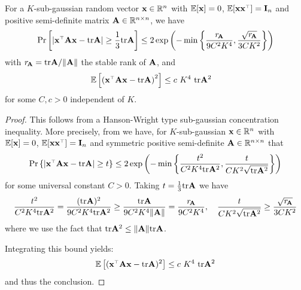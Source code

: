\documentclass[thesis.tex]{subfiles}
\begin{document}
%
%
%
\begin{lemma}
\label{l:concentration-sub-gaussian}
For a $K$-sub-gaussian random vector $\mathbf x \in \mathbb R^n$ with $\mathbb E[\mathbf x] = 0$, $\E[\x \x^\top] = \I_n$ and positive semi-definite matrix $\mathbf A \in \mathbb R^{n \times n}$, we have
\[
  \Pr\left[
    \lvert \x^\top \A \x - \tr \A \rvert
    \geq \frac13 \tr \A
    \right] \leq 2 \exp\left( - \min \left\{ \frac{r_{\!\A}}{9 C^2 K^4}, \frac{\sqrt{r_{\!\A}}}{3 C K^2}  \right\} \right)
\]
with $r_{\!\mathbf A} = \mathrm{tr} \mathbf A/\| \mathbf A \|$ the stable rank of $\mathbf A$, and 
\begin{align*}
  \E\left[ \left( \x^\top \A \x - \tr \A \right)^2 \right]
  &\leq c~K^4~\tr \A^2
\end{align*}
for some $C,c > 0$ independent of $K$.
\end{lemma}

\begin{proof}
This follows from a Hanson-Wright type \cite{rudelson2013hanson} sub-gaussian concentration inequality. More precisely,
from \cite[Corollary 2.9]{zajkowski2018bounds} we have, for $K$-sub-gaussian $\mathbf x \in \mathbb R^n$ with $\mathbb E[\mathbf x] = 0$, $\E[\x \x^\top] = \I_n$ and symmetric positive semi-definite $\mathbf A \in \mathbb R^{n \times n}$ that 
\[
  \Pr \left\{ \left| \x^\top \A \x - \tr \A  \right| \ge t \right\} \le 2 \exp \left( - \min \left\{ \frac{t^2}{C^2 K^4 \tr\A^2 },  \frac{t}{C K^2 \sqrt{\tr\A^2}  } \right\} \right)
\]
for some universal constant $C > 0$. Taking $t = \frac13 \mathrm{tr} \mathbf A$ we have
\[
  \frac{t^2}{C^2 K^4 \mathrm{tr}\mathbf A^2 } = \frac{ (\mathrm{tr} \mathbf A)^2 }{9 C^2 K^4 \mathrm{tr}\mathbf A^2 } \ge \frac{ \mathrm{tr} \mathbf A }{9 C^2 K^4 \| \mathbf A \| } = \frac{r_{\!\mathbf A}}{9 C^2 K^4}, \quad \frac{t}{C K^2 \sqrt{\mathrm{tr}\mathbf A^2}  } \ge \frac{\sqrt{r_{\!\mathbf A}}}{3 C K^2}
\]
where we use the fact that $\mathrm{tr} \mathbf A^2 \le \| \mathbf A \| \mathrm{tr} \mathbf A$.

Integrating this bound yields:
\[
  \E\left[ (\x^\top \A \x - \tr \A )^2 \right] \le c~K^4~\tr \A^2
\]
and thus the conclusion.
\end{proof}
\end{document}
